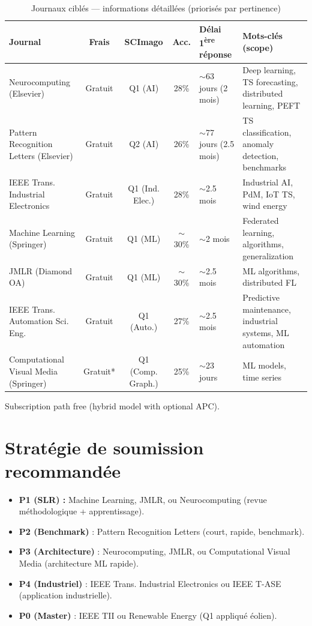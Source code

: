 \documentclass[12pt, a4paper]{report}
\begin{document}
\begin{table}[h!]
\centering
\caption{Journaux ciblés — informations détaillées (priorisés par pertinence)}
\label{tab:journals}
\renewcommand{\arraystretch}{1.4}
\small
\begin{tabularx}{\textwidth}{>{\raggedright\arraybackslash}p{3cm}cccp{2.8cm}X}
\toprule
\textbf{Journal} & \textbf{Frais} & \textbf{SCImago} & \textbf{Acc.} & \textbf{Délai 1\textsuperscript{ère} réponse} & \textbf{Mots-clés (scope)} \\
\midrule
Neurocomputing (Elsevier) & Gratuit & Q1 (AI) & 28\% & $\sim$63 jours (2 mois) & Deep learning, TS forecasting, distributed learning, PEFT \\
\addlinespace[2pt]
Pattern Recognition Letters (Elsevier) & Gratuit & Q2 (AI) & 26\% & $\sim$77 jours (2.5 mois) & TS classification, anomaly detection, benchmarks \\
\addlinespace[2pt]
IEEE Trans. Industrial Electronics & Gratuit & Q1 (Ind. Elec.) & 28\% & $\sim$2.5 mois & Industrial AI, PdM, IoT TS, wind energy \\
\addlinespace[2pt]
Machine Learning (Springer) & Gratuit & Q1 (ML) & $\sim$30\% & $\sim$2 mois & Federated learning, algorithms, generalization \\
\addlinespace[2pt]
JMLR (Diamond OA) & Gratuit & Q1 (ML) & $\sim$30\% & $\sim$2.5 mois & ML algorithms, distributed FL \\
\addlinespace[2pt]
IEEE Trans. Automation Sci. Eng. & Gratuit & Q1 (Auto.) & 27\% & $\sim$2.5 mois & Predictive maintenance, industrial systems, ML automation \\
\addlinespace[2pt]
Computational Visual Media (Springer) & Gratuit* & Q1 (Comp. Graph.) & 25\% & $\sim$23 jours & ML models, time series \\
\bottomrule
\end{tabularx}
\vspace{0.3em}
{\footnotesize *Subscription path free (hybrid model with optional APC).}
\end{table}

\section{Stratégie de soumission recommandée}

\begin{itemize}
  \item \textbf{P1 (SLR) :} Machine Learning, JMLR, ou Neurocomputing (revue méthodologique + apprentissage).
  \item \textbf{P2 (Benchmark)} : Pattern Recognition Letters (court, rapide, benchmark).
  \item \textbf{P3 (Architecture)} : Neurocomputing, JMLR, ou Computational Visual Media (architecture ML rapide).
  \item \textbf{P4 (Industriel)} : IEEE Trans. Industrial Electronics ou IEEE T-ASE (application industrielle).
  \item \textbf{P0 (Master)} : IEEE TII ou Renewable Energy (Q1 appliqué éolien).
\end{itemize}
\end{document}
